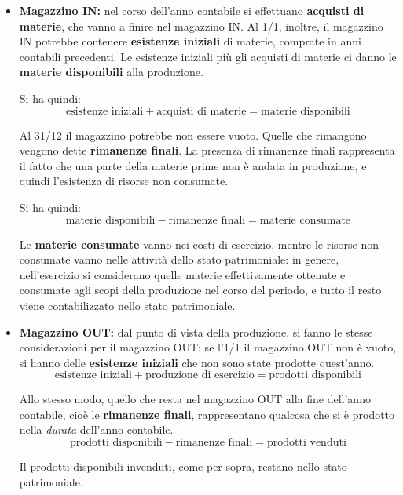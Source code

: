 \documentclass[a4paper,11pt]{article}
\begin{document}
\begin{itemize}
	\item \textbf{Magazzino IN:}
nel corso dell'anno contabile si effettuano \textbf{acquisti di materie}, che vanno a finire nel magazzino IN.
Al 1/1, inoltre, il magazzino IN potrebbe contenere \textbf{esistenze iniziali} di materie, comprate in anni contabili precedenti.
Le esistenze iniziali più gli acquisti di materie ci danno le \textbf{materie disponibili} alla produzione.

Si ha quindi:
$$
\text{esistenze iniziali} + \text{acquisti di materie} = \text{materie disponibili}
$$

Al 31/12 il magazzino potrebbe non essere vuoto.
Quelle che rimangono vengono dette \textbf{rimanenze finali}.
La presenza di rimanenze finali rappresenta il fatto che una parte della materie prime non è andata in produzione, e quindi l'esistenza di risorse non consumate.

Si ha quindi:
$$
\text{materie disponibili} - \text{rimanenze finali} = \text{materie consumate}
$$

Le \textbf{materie consumate} vanno nei costi di esercizio, mentre le risorse non consumate vanno nelle attività dello stato patrimoniale: in genere, nell'esercizio si considerano quelle materie effettivamente ottenute e consumate agli scopi della produzione nel corso del periodo, e tutto il resto viene contabilizzato nello stato patrimoniale.

\item \textbf{Magazzino OUT:}
	dal punto di vista della produzione, si fanno le stesse considerazioni per il magazzino OUT: se l'1/1 il magazzino OUT non è vuoto, si hanno delle \textbf{esistenze iniziali} che non sono state prodotte quest'anno.
$$
\text{esistenze iniziali} + \text{produzione di esercizio} = \text{prodotti disponibili}
$$

	Allo stesso modo, quello che resta nel magazzino OUT alla fine dell'anno contabile, cioè le \textbf{rimanenze finali}, rappresentano qualcosa che si è prodotto nella \textit{durata} dell'anno contabile.
$$
\text{prodotti disponibili} - \text{rimanenze finali} = \text{prodotti venduti}
$$

Il prodotti disponibili invenduti, come per sopra, restano nello stato patrimoniale.

\end{itemize}
\end{document}
